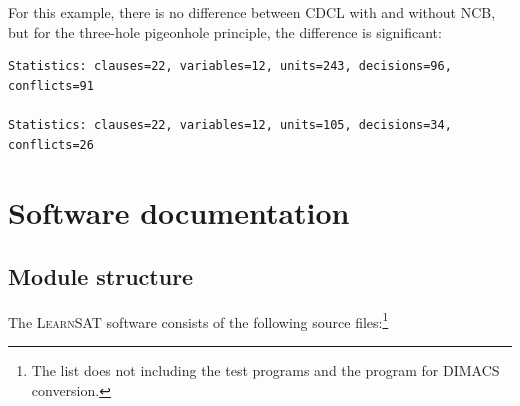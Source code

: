 \documentclass[11pt]{report}
\newcommand*{\ls}{\textsc{LearnSAT}}
\begin{document}
For this example, there is no difference between CDCL with and without
NCB, but for the three-hole pigeonhole principle, the difference is
significant:
\begin{verbatim}
Statistics: clauses=22, variables=12, units=243, decisions=96, conflicts=91

Statistics: clauses=22, variables=12, units=105, decisions=34, conflicts=26
\end{verbatim}


\chapter{Software documentation}

\section{Module structure}

The \ls{} software consists of the following source files:\footnote{The
list does not including the test programs and the program for DIMACS
conversion.}
\end{document}

